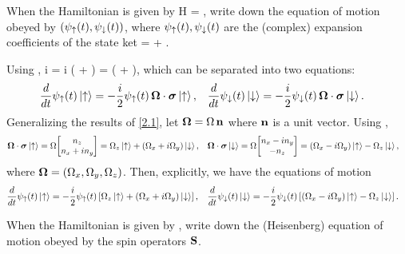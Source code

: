 \newcommand{\vaa}{\vec{a}}
\newcommand{\vbb}{\vec{b}}
\newcommand{\costt}{\cos{\frac{t}{2}}}
\newcommand{\sintt}{\sin{\frac{t}{2}}}

\begin{problem}
	When the Hamiltonian is given by
	\beqn \label{ham3}
		H =  \Ods,
	\eeqn
	write down the equation of motion obeyed by $(\psi_\uparrow(t), \psi_\downarrow(t))$, where $\psi_\uparrow(t), \psi_\downarrow(t)$ are the (complex) expansion coefficients of the state ket
	\beq
		\kpsit = \psiut \kup + \psidt \kdn.
	\eeq
\vfix
\end{problem}

\begin{solution}
	Using ,
	\beq
		i \hbar {} \kpsit =  \Ods \kpsit
		\iff
		i \hbar {} \left( \psiut \kup + \psidt \kdn \right) =  \Ods \left( \psiut \kup + \psidt \kdn \right),
	\eeq
	which can be separated into two equations:
	\begin{align}
		\dv{}{t} \psi_\uparrow(t) \ket{\uparrow} &= -\frac{i}{2} \psi_\uparrow(t) \, \boldsymbol{\Omega} \cdot \boldsymbol{\sigma} \ket{\uparrow}, &
		\dv{}{t} \psi_\downarrow(t) \ket{\downarrow} &= -\frac{i}{2} \psi_\downarrow(t) \, \boldsymbol{\Omega} \cdot \boldsymbol{\sigma} \ket{\downarrow}.
	\end{align}
	Generalizing the results of \ref{2.1}, let $\boldsymbol{\Omega} = \Omega \, \mathbf{n}$ where $\mathbf{n}$ is a unit vector.  Using ,
	\begin{align*}
		\Ods \kup &= \Omega \mqty[ \nz \\ \nx + i \ny ] = \Omz \kup + (\Omx + i \Omy) \kdn, &
		\Ods \kdn &= \Omega \mqty[ \nx - i \ny \\ -\nz ] = (\Omx - i \Omy) \kup - \Omz \kdn,
	\end{align*}
	where $\boldsymbol{\Omega} = (\Omega_x, \Omega_y, \Omega_z)$.  Then, explicitly, we have the equations of motion
	\begin{align}
		\dv{}{t} \psi_\uparrow(t) \ket{\uparrow} &= -\frac{i}{2} \psi_\uparrow(t) \left[ \Omega_z \ket{\uparrow} + (\Omega_x + i \Omega_y) \ket{\downarrow} \right], &
		\dv{}{t} \psi_\downarrow(t) \ket{\downarrow} &= -\frac{i}{2} \psi_\downarrow(t) \left[ (\Omega_x - i \Omega_y) \ket{\uparrow} - \Omega_z \ket{\downarrow} \right].
	\end{align}
\vfix
\end{solution}

\newcommand{\sigi}{\sig_i}
\newcommand{\sigj}{\sig_j}
\newcommand{\sigk}{\sig_k}
\newcommand{\lct}{\varepsilon_{ijk}}
\newcommand{\Sq}{S_1}
\newcommand{\Sw}{S_2}
\newcommand{\Se}{S_3}
\newcommand{\Si}{S_i}
\newcommand{\Omq}{\Omega_1}
\newcommand{\Omw}{\Omega_2}
\newcommand{\Ome}{\Omega_3}
\newcommand{\Omj}{\Omega_j}

\newcommand{\Sx}{S_x}

\begin{problem}
	When the Hamiltonian is given by , write down the (Heisenberg) equation of motion obeyed by the spin operators $\mathbf{S}$.
\end{problem}

